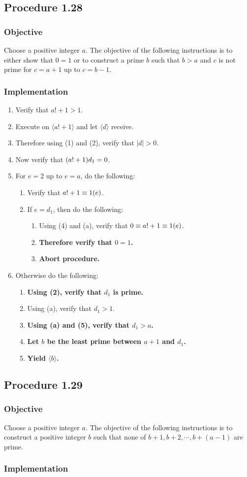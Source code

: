 \documentclass[twocolumn]{article}
\let\mod\relax
\DeclareMathOperator{\mod}{mod}
\newcommand{\procedure}[2][]{\subsection*{Procedure #2 \ifthenelse{\equal{#1}{}}{}{(#1)}}\label{sec:procedure #2}}
\newcommand{\objective}{\subsubsection*{Objective}}
\newcommand{\implementation}{\subsubsection*{Implementation}}
\newcommand{\procedurehr}[2][]{\hyperref[sec:procedure #2]{\ifthenelse{\equal{#1}{}}{procedure #2}{#1}}}
\begin{document}
		\procedure{1.28}
			\objective
				Choose a positive integer $a$. The objective of the following instructions is to either show that $0=1$ or to construct a prime $b$ such that $b>a$ and $c$ is not prime for $c=a+1$ up to $c=b-1$.
			\implementation
				\begin{enumerate}
					\item Verify that $a!+1>1$.
					\item Execute \procedurehr{1.24} on $\langle a!+1\rangle$ and let $\langle d\rangle$ receive.
					\item Therefore using (1) and (2), verify that $\lvert d\rvert>0$.
					\item Now verify that $(a!+1)\mod d_1=0$.
					\item For $e=2$ up to $e=a$, do the following:
					\begin{enumerate}
						\item Verify that $a!+1\equiv 1 (\mod e)$.
						\item If $e=d_1$, then do the following:
						\begin{enumerate}
							\item Using (4) and (a), verify that $0\equiv a!+1\equiv 1(\mod e)$.
							\item \textbf{Therefore verify that $0=1$.}
							\item \textbf{Abort procedure.}
						\end{enumerate}
					\end{enumerate}
					\item Otherwise do the following:
					\begin{enumerate}
						\item \textbf{Using (2), verify that $d_1$ is prime.}
						\item Using (a), verify that $d_1>1$.
						\item \textbf{Using (a) and (5), verify that $d_1>a$.}
						\item \textbf{Let $b$ be the least prime between $a+1$ and $d_1$.}
						\item \textbf{Yield $\langle b\rangle$.}
					\end{enumerate}
				\end{enumerate}
		\procedure{1.29}
			\objective
				Choose a positive integer $a$. The objective of the following instructions is to construct a positive integer $b$ such that none of $b+1,b+2,\cdots,b+(a-1)$ are prime.
			\implementation
\end{document}
